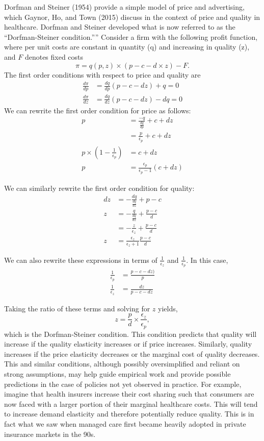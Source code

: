 \documentclass[
  letterpaper,
  DIV=11,
  numbers=noendperiod]{scrreport}
\theoremstyle{definition}
\theoremstyle{remark}
\begin{document}
Dorfman and Steiner (1954) provide a simple model of price and
advertising, which Gaynor, Ho, and Town (2015) discuss in the context of
price and quality in healthcare. Dorfman and Steiner developed what is
now referred to as the ``Dorfman-Steiner condition.'''' Consider a firm
with the following profit function, where per unit costs are constant in
quantity (q) and increasing in quality (z), and \(F\) denotes fixed
costs \[\pi = q(p,z) \times (p-c-d\times z) - F.\] The first order
conditions with respect to price and quality are \[\begin{align*}
 \frac{d \pi}{d p} &= \frac{d q}{d p} (p-c-dz) + q = 0 \\
 \frac{d \pi}{d z} &= \frac{d q}{d z} (p-c-dz) - dq = 0
\end{align*}\] We can rewrite the first order condition for price as
follows: \[\begin{align*}
p &= \frac{-q}{\frac{d q}{d p}} + c + dz \\
  &= \frac{p}{\epsilon_{p}} + c + dz \\
p \times \left(1 - \frac{1}{\epsilon_{p}}\right) &= c + dz \\
p &= \frac{\epsilon_{p}}{\epsilon_{p}-1} (c+dz)
\end{align*}\]

We can similarly rewrite the first order condition for quality:
\[\begin{align*}
 dz &= -\frac{dq}{\frac{d q}{d z}} + p - c \\
  z &= -\frac{q}{\frac{d q}{d z}} + \frac{p-c}{d} \\
    &= -\frac{z}{\epsilon_{z}} + \frac{p-c}{d} \\
  z &= \frac{\epsilon_{z}}{\epsilon_{z}+1} \frac{p-c}{d}
\end{align*}\]

We can also rewrite these expressions in terms of
\(\frac{1}{\epsilon_{z}}\) and \(\frac{1}{\epsilon_{p}}\). In this case,
\[\begin{align*}
\frac{1}{\epsilon_{p}} &= \frac{p-c-dz)}{p} \\
\frac{1}{\epsilon_{z}} &= \frac{dz}{p - c - dz}
\end{align*}\]

Taking the ratio of these terms and solving for \(z\) yields,
\[z = \frac{p}{d}\times \frac{\epsilon_{z}}{\epsilon_{p}},\] which is
the Dorfman-Steiner condition. This condition predicts that quality will
increase if the quality elasticity increases or if price increases.
Similarly, quality increases if the price elasticity decreases or the
marginal cost of quality decreases. This and similar conditions,
although possibly oversimplified and reliant on strong assumptions, may
help guide empirical work and provide possible predictions in the case
of policies not yet observed in practice. For example, imagine that
health insurers increase their cost sharing such that consumers are now
faced with a larger portion of their marginal healthcare costs. This
will tend to increase demand elasticity and therefore potentially reduce
quality. This is in fact what we saw when managed care first became
heavily adopted in private insurance markets in the 90s.
\end{document}
